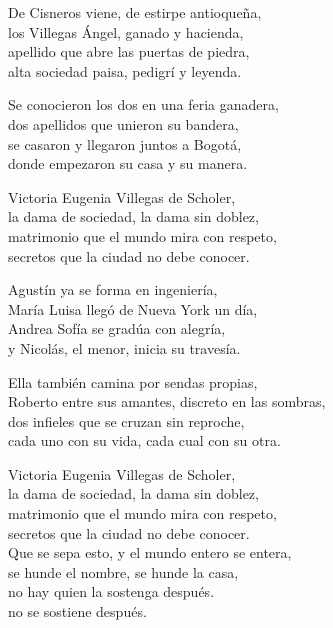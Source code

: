 \begin{lyrics}
De Cisneros viene, de estirpe antioqueña,\\
los Villegas Ángel, ganado y hacienda,\\
apellido que abre las puertas de piedra,\\
alta sociedad paisa, pedigrí y leyenda.

Se conocieron los dos en una feria ganadera,\\
dos apellidos que unieron su bandera,\\
se casaron y llegaron juntos a Bogotá,\\
donde empezaron su casa y su manera.

Victoria Eugenia Villegas de Scholer,\\
la dama de sociedad, la dama sin doblez,\\
matrimonio que el mundo mira con respeto,\\
secretos que la ciudad no debe conocer.

Agustín ya se forma en ingeniería,\\
María Luisa llegó de Nueva York un día,\\
Andrea Sofía se gradúa con alegría,\\
y Nicolás, el menor, inicia su travesía.

Ella también camina por sendas propias,\\
Roberto entre sus amantes, discreto en las sombras,\\
dos infieles que se cruzan sin reproche,\\
cada uno con su vida, cada cual con su otra.

Victoria Eugenia Villegas de Scholer,\\
la dama de sociedad, la dama sin doblez,\\
matrimonio que el mundo mira con respeto,\\
secretos que la ciudad no debe conocer.\\
Que se sepa esto, y el mundo entero se entera,\\
se hunde el nombre, se hunde la casa,\\
no hay quien la sostenga después.\\
no se sostiene después.
\end{lyrics}

